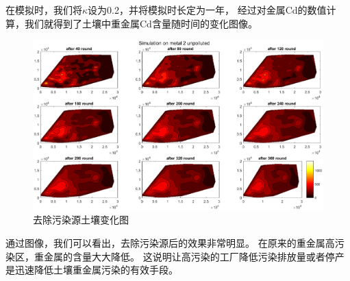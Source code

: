 \documentclass[a4paper]{article}
\begin{document}
在模拟时，我们将$\kappa$设为0.2，并将模拟时长定为一年，
经过对金属Cd的数值计算，我们就得到了土壤中重金属Cd含量随时间的变化图像。
\begin{figure}[H]
    \centerline{
    \includegraphics[scale=0.5]{pictures/unpolluted.eps}}
    \caption{去除污染源土壤变化图}
    \label{fig:unpolluted}
\end{figure}
通过图像，我们可以看出，去除污染源后的效果非常明显。
在原来的重金属高污染区，重金属的含量大大降低。
这说明让高污染的工厂降低污染排放量或者停产是迅速降低土壤重金属污染的有效手段。
\end{document}
